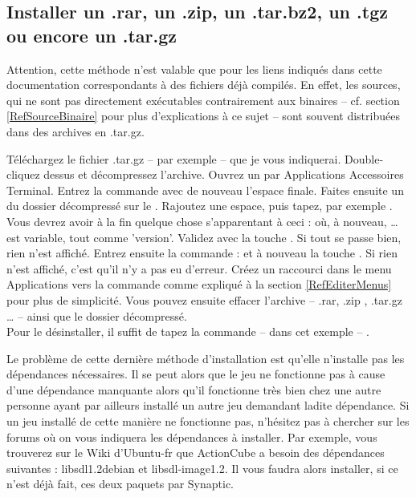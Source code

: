 \subsection{Installer un .rar, un .zip, un .tar.bz2, un .tgz ou encore un .tar.gz}
\begin{nota}
Attention, cette méthode n'est valable que pour les liens indiqués dans cette documentation correspondants à des fichiers déjà compilés. En effet, les sources, qui ne sont pas directement exécutables contrairement aux binaires -- cf. section \ref{RefSourceBinaire} pour plus d'explications à ce sujet -- sont souvent distribuées dans des archives en .tar.gz.
\end{nota}
Téléchargez le fichier .tar.gz -- par exemple -- que je vous indiquerai. Double-cliquez dessus et décompressez l'archive. Ouvrez un  par Applications \FlecheDroite Accessoires \FlecheDroite Terminal. Entrez la commande  avec de nouveau l'espace finale. Faites ensuite un  du dossier décompressé sur le . Rajoutez une espace, puis tapez, par exemple . Vous devrez avoir à la fin quelque chose s'apparentant à ceci :  où, à nouveau, \ldots{} est variable, tout comme 'version'. Validez avec la touche . Si tout se passe bien, rien n'est affiché. Entrez ensuite la commande :  et à nouveau la touche . Si rien n'est affiché, c'est qu'il n'y a pas eu d'erreur. Créez un raccourci dans le menu Applications vers la commande  comme expliqué à la section \ref{RefEditerMenus} pour plus de simplicité. Vous pouvez ensuite effacer l'archive -- .rar, .zip , .tar.gz \ldots{} -- ainsi que le dossier décompressé.\\
Pour le désinstaller, il suffit de tapez la commande -- dans cet exemple -- .
\begin{nota}
Le problème de cette dernière méthode d'installation est qu'elle n'installe pas les dépendances nécessaires. Il se peut alors que le jeu ne fonctionne pas à cause d'une dépendance manquante alors qu'il fonctionne très bien chez une autre personne ayant par ailleurs installé un autre jeu demandant ladite dépendance. Si un jeu installé de cette manière ne fonctionne pas, n'hésitez pas à chercher sur les forums où on vous indiquera les dépendances à installer. Par exemple, vous trouverez sur le Wiki d'Ubuntu-fr que ActionCube a besoin des dépendances suivantes : libsdl1.2debian et libsdl-image1.2. Il vous faudra alors installer, si ce n'est déjà fait, ces deux paquets par Synaptic.
\end{nota}
